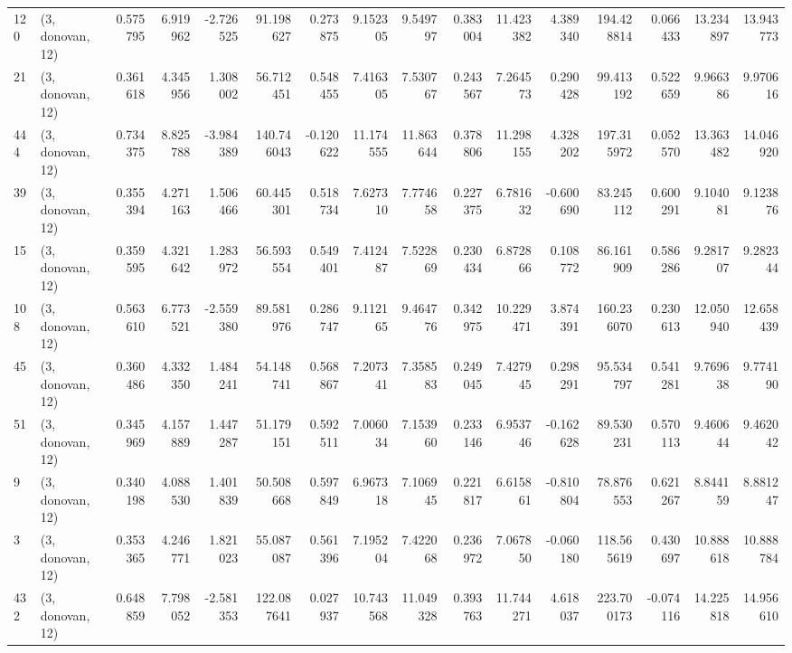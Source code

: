 \begin{tabular}{llrrrrrrrrrrrrrr}
120 &  (3, donovan, 12) &   0.575795 &   6.919962 &  -2.726525 &    91.198627 &   0.273875 &   9.152305 &   9.549797 &  0.383004 &  11.423382 &   4.389340 &   194.428814 &   0.066433 &  13.234897 &  13.943773 \\
21  &  (3, donovan, 12) &   0.361618 &   4.345956 &   1.308002 &    56.712451 &   0.548455 &   7.416305 &   7.530767 &  0.243567 &   7.264573 &   0.290428 &    99.413192 &   0.522659 &   9.966386 &   9.970616 \\
444 &  (3, donovan, 12) &   0.734375 &   8.825788 &  -3.984389 &   140.746043 &  -0.120622 &  11.174555 &  11.863644 &  0.378806 &  11.298155 &   4.328202 &   197.315972 &   0.052570 &  13.363482 &  14.046920 \\
39  &  (3, donovan, 12) &   0.355394 &   4.271163 &   1.506466 &    60.445301 &   0.518734 &   7.627310 &   7.774658 &  0.227375 &   6.781632 &  -0.600690 &    83.245112 &   0.600291 &   9.104081 &   9.123876 \\
15  &  (3, donovan, 12) &   0.359595 &   4.321642 &   1.283972 &    56.593554 &   0.549401 &   7.412487 &   7.522869 &  0.230434 &   6.872866 &   0.108772 &    86.161909 &   0.586286 &   9.281707 &   9.282344 \\
108 &  (3, donovan, 12) &   0.563610 &   6.773521 &  -2.559380 &    89.581976 &   0.286747 &   9.112165 &   9.464776 &  0.342975 &  10.229471 &   3.874391 &   160.236070 &   0.230613 &  12.050940 &  12.658439 \\
45  &  (3, donovan, 12) &   0.360486 &   4.332350 &   1.484241 &    54.148741 &   0.568867 &   7.207341 &   7.358583 &  0.249045 &   7.427945 &   0.298291 &    95.534797 &   0.541281 &   9.769638 &   9.774190 \\
51  &  (3, donovan, 12) &   0.345969 &   4.157889 &   1.447287 &    51.179151 &   0.592511 &   7.006034 &   7.153960 &  0.233146 &   6.953746 &  -0.162628 &    89.530231 &   0.570113 &   9.460644 &   9.462042 \\
9   &  (3, donovan, 12) &   0.340198 &   4.088530 &   1.401839 &    50.508668 &   0.597849 &   6.967318 &   7.106945 &  0.221817 &   6.615861 &  -0.810804 &    78.876553 &   0.621267 &   8.844159 &   8.881247 \\
3   &  (3, donovan, 12) &   0.353365 &   4.246771 &   1.821023 &    55.087087 &   0.561396 &   7.195204 &   7.422068 &  0.236972 &   7.067850 &  -0.060180 &   118.565619 &   0.430697 &  10.888618 &  10.888784 \\
432 &  (3, donovan, 12) &   0.648859 &   7.798052 &  -2.581353 &   122.087641 &   0.027937 &  10.743568 &  11.049328 &  0.393763 &  11.744271 &   4.618037 &   223.700173 &  -0.074116 &  14.225818 &  14.956610 \\

\end{tabular}
